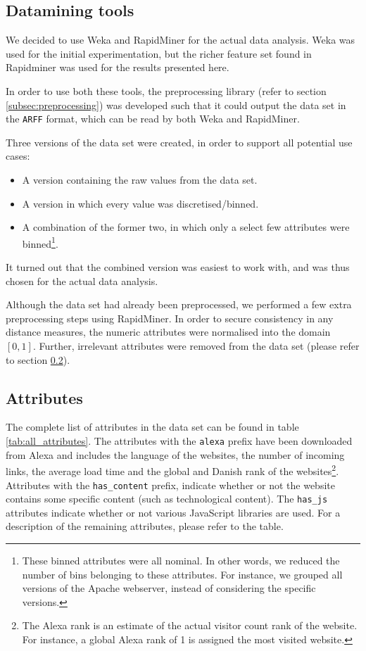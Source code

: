 \subsection{Datamining tools}
\label{subsec:weka}


We decided to use Weka and RapidMiner for the actual data analysis. Weka was used for the initial experimentation, but the richer feature set found in Rapidminer was used for the results presented here. 

In order to use both these tools, the preprocessing library (refer to section \ref{subsec:preprocessing}) was developed such that it could output the data set in the \texttt{ARFF} format, which can be read by both Weka and RapidMiner.

Three versions of the data set were created, in order to support all potential use cases:

\begin{itemize}
\item A version containing the raw values from the data set.
\item A version in which every value was discretised/binned.
\item A combination of the former two, in which only a select few attributes were binned\footnote{These binned attributes were all nominal. In other words, we reduced the number of bins belonging to these attributes. For instance, we grouped all versions of the Apache webserver, instead of considering the specific versions.}.
\end{itemize}

It turned out that the combined version was easiest to work with, and was thus chosen for the actual data analysis.

Although the data set had already been preprocessed, we performed a few extra preprocessing steps using RapidMiner. In order to secure consistency in any distance measures, the numeric attributes were normalised into the domain $[0, 1]$. Further, irrelevant attributes were removed from the data set (please refer to section \ref{subsec:attributes}).

\subsection{Attributes}
\label{subsec:attributes}

The complete list of attributes in the data set can be found in table \ref{tab:all_attributes}. The attributes with the \texttt{alexa} prefix have been downloaded from Alexa and includes the language of the websites, the number of incoming links, the average load time and the global and Danish rank of the websites\footnote{The Alexa rank is an estimate of the actual visitor count rank of the website. For instance, a global Alexa rank of 1 is assigned the most visited website.}. Attributes with the \texttt{has\_content} prefix, indicate whether or not the website contains some specific content (such as technological content). The \texttt{has\_js} attributes indicate whether or not various JavaScript libraries are used. For a description of the remaining attributes, please refer to the table.

